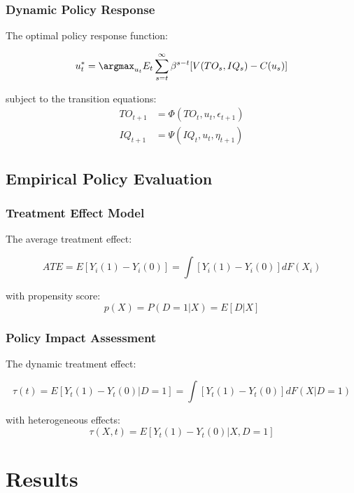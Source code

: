 \documentclass[12pt,a4paper]{article}
\theoremstyle{definition}
\begin{document}
\subsubsection{Dynamic Policy Response}
The optimal policy response function:

\begin{equation}
u_t^* = \argmax_{u_t} E_t\sum_{s=t}^{\infty} \beta^{s-t}[V(TO_s, IQ_s) - C(u_s)]
\end{equation}

subject to the transition equations:
\begin{align}
TO_{t+1} &= \Phi(TO_t, u_t, \epsilon_{t+1}) \\
IQ_{t+1} &= \Psi(IQ_t, u_t, \eta_{t+1})
\end{align}

\subsection{Empirical Policy Evaluation}
\subsubsection{Treatment Effect Model}
The average treatment effect:

\begin{equation}
ATE = E[Y_i(1) - Y_i(0)] = \int [Y_i(1) - Y_i(0)]dF(X_i)
\end{equation}

with propensity score:
\begin{equation}
p(X) = P(D=1|X) = E[D|X]
\end{equation}

\subsubsection{Policy Impact Assessment}
The dynamic treatment effect:

\begin{equation}
\tau(t) = E[Y_t(1) - Y_t(0)|D=1] = \int [Y_t(1) - Y_t(0)]dF(X|D=1)
\end{equation}

with heterogeneous effects:
\begin{equation}
\tau(X,t) = E[Y_t(1) - Y_t(0)|X,D=1]
\end{equation}

\section{Results}
\end{document}
